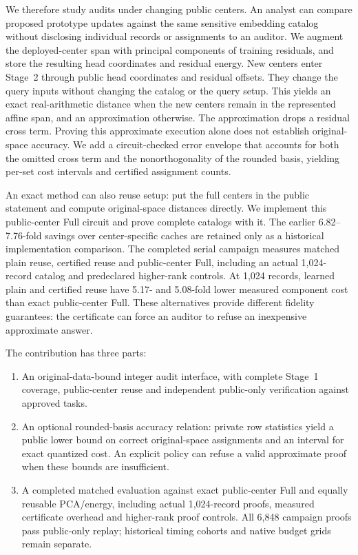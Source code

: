 We therefore study audits under changing public centers. An analyst can compare proposed prototype updates against the same sensitive embedding catalog without disclosing individual records or assignments to an auditor. We augment the deployed-center span with principal components of training residuals, and store the resulting head coordinates and residual energy. New centers enter Stage~2 through public head coordinates and residual offsets. They change the query inputs without changing the catalog or the query setup. This yields an exact real-arithmetic distance when the new centers remain in the represented affine span, and an approximation otherwise. The approximation drops a residual cross term. Proving this approximate execution alone does not establish original-space accuracy. We add a circuit-checked error envelope that accounts for both the omitted cross term and the nonorthogonality of the rounded basis, yielding per-set cost intervals and certified assignment counts.

An exact method can also reuse setup: put the full centers in the public statement and compute original-space distances directly. We implement this public-center Full circuit and prove complete catalogs with it. The earlier 6.82--7.76-fold savings over center-specific caches are retained only as a historical implementation comparison. The completed serial campaign measures matched plain reuse, certified reuse and public-center Full, including an actual 1,024-record catalog and predeclared higher-rank controls. At 1,024 records, learned plain and certified reuse have 5.17- and 5.08-fold lower measured component cost than exact public-center Full. These alternatives provide different fidelity guarantees: the certificate can force an auditor to refuse an inexpensive approximate answer.

The contribution has three parts:
\begin{enumerate}[leftmargin=*]
\item An original-data-bound integer audit interface, with complete Stage~1 coverage, public-center reuse and independent public-only verification against approved tasks.
\item An optional rounded-basis accuracy relation: private row statistics yield a public lower bound on correct original-space assignments and an interval for exact quantized cost. An explicit policy can refuse a valid approximate proof when these bounds are insufficient.
\item A completed matched evaluation against exact public-center Full and equally reusable PCA/energy, including actual 1,024-record proofs, measured certificate overhead and higher-rank proof controls. All 6,848 campaign proofs pass public-only replay; historical timing cohorts and native budget grids remain separate.
\end{enumerate}

